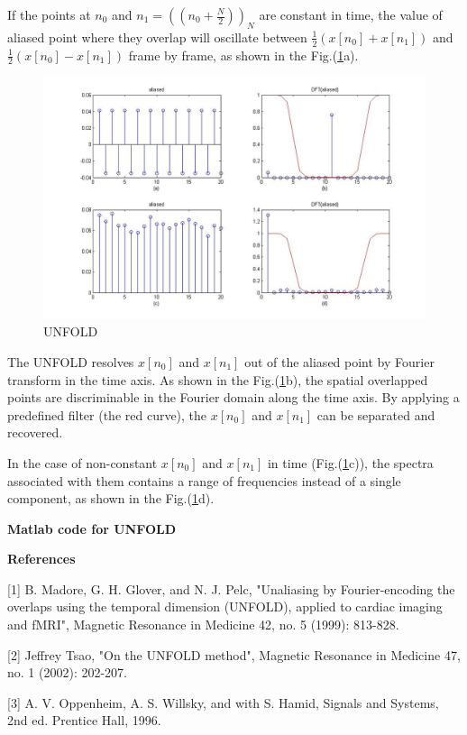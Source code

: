 \documentclass[12pt,a4paper]{article}
\begin{document}
\begin{CJK}{UTF8}{songti}
If the points at $n_0$ and $n_1=((n_0+\frac{N}{2}))_N$ are constant in time, the value of aliased point where they overlap will oscillate between $\frac{1}{2}(x[n_0]+x[n_1])$ and $\frac{1}{2}(x[n_0]-x[n_1])$ frame by frame, as shown in the Fig.(\ref{unfold}a).
\begin{figure}
\centering
\includegraphics[scale=.5]{unfold.jpg}
\caption{UNFOLD}
\label{unfold}
\end{figure} 

The UNFOLD resolves $x[n_0]$ and $x[n_1]$ out of the aliased point by Fourier transform in the time axis. As shown in the Fig.(\ref{unfold}b), the spatial overlapped points are discriminable in the Fourier domain along the time axis. By applying a predefined filter (the red curve), the $x[n_0]$ and $x[n_1]$ can be separated and recovered.

In the case of non-constant $x[n_0]$ and $x[n_1]$ in time (Fig.(\ref{unfold}c)), the spectra associated with them contains a range of frequencies instead of a single component, as shown in the Fig.(\ref{unfold}d).


\medskip
\textbf{Matlab code for UNFOLD}


\textbf{References}

[1] B. Madore, G. H. Glover, and N. J. Pelc, "Unaliasing by Fourier-encoding the overlaps using the temporal dimension (UNFOLD), applied to cardiac imaging and fMRI", Magnetic Resonance in Medicine 42, no. 5 (1999): 813-828.

[2] Jeffrey Tsao, "On the UNFOLD method", Magnetic Resonance in Medicine 47, no. 1 (2002): 202-207.

[3] A. V. Oppenheim, A. S. Willsky, and  with S. Hamid, Signals and Systems, 2nd ed. Prentice Hall, 1996.

%
%

\end{CJK}
\end{document}
